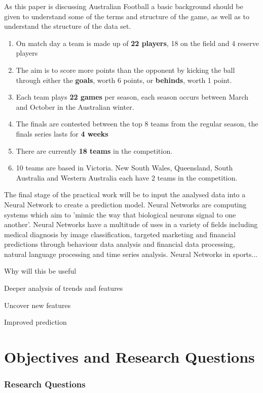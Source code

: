 \documentclass{imc-inf}
\begin{document}
	As this paper is discussing Australian Football a basic background should be given to understand some of the terms and structure of the game, as well as to understand the structure of the data set. 
	\begin{enumerate}
		\item On match day a team is made up of \textbf{22 players}, 18 on the field and 4 reserve players
		\item The aim is to score more points than the opponent by kicking the ball through either the \textbf{goals}, worth 6 points, or \textbf{behinds}, worth 1 point.
		\item Each team plays \textbf{22 games} per season, each season occurs between March and October in the Australian winter.
		\item The finals are contested between the top 8 teams from the regular season, the finals series lasts for \textbf{4 weeks}
		\item There are currently \textbf{18 teams} in the competition.
		\item 10 teams are based in Victoria. New South Wales, Queensland, South Australia and Western Australia each have 2 teams in the competition.
	\end{enumerate}
	
	The final stage of the practical work will be to input the analysed data into a Neural Network to create a prediction model. Neural Networks are computing systems which aim to 'mimic the way that biological neurons signal to one another'\cite{website:IBM}. Neural Networks have a multitude of uses in a variety of fields including medical diagnosis by image classification, targeted marketing and financial predictions through behaviour data analysis and financial data processing, natural language processing and time series analysis. 
	Neural Networks in sports...
	\linebreak
	
	Why will this be useful 
	
	Deeper analysis of trends and features
	
	Uncover new features
	
	Improved prediction
	
	\chapter{Objectives and Research Questions}\label{chap:objectives}
	\subsection{Research Questions}
	
\end{document}
